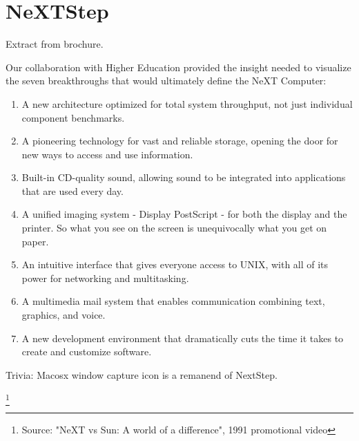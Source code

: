 \section{NeXTStep}
 Extract from brochure.

 Our collaboration with Higher Education provided the insight needed to visualize the seven breakthroughs that would ultimately define the NeXT Computer:\\
\begin{enumerate}
\item A new architecture optimized for total system throughput, not just individual component benchmarks.

\item A pioneering technology for vast and reliable storage, opening the door for new ways to access and use information.

\item Built-in CD-quality sound, allowing sound to be integrated into applications that are used every day.

\item A unified imaging system - Display PostScript - for both the display and the printer. So what you see on the screen is unequivocally what you get on paper.

\item An intuitive interface that gives everyone access to UNIX, with all of its power for networking and multitasking.

\item A multimedia mail system that enables communication combining text, graphics, and voice.

\item A new development environment that dramatically cuts the time it takes to create and customize software.
\end{enumerate}

\par
Trivia: Macosx window capture icon is a remanend of NextStep.\\
\par
\footnote{Source: "NeXT vs Sun: A world of a difference", 1991 promotional video}

















